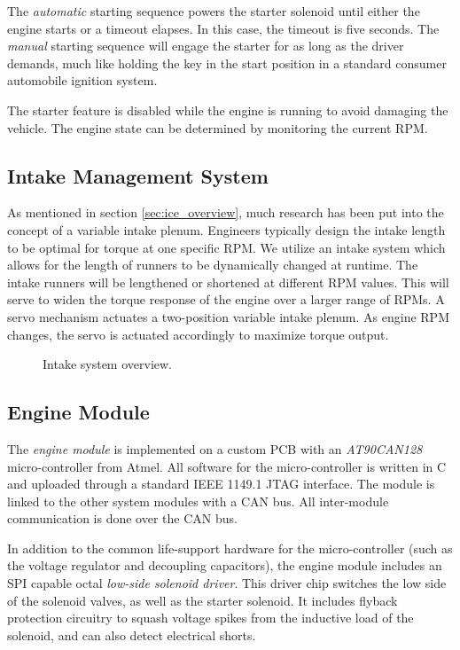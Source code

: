 The \emph{automatic} starting sequence powers the starter solenoid until either the engine starts or a timeout elapses. In this case, the timeout is five seconds. The \emph{manual} starting sequence will engage the starter for as long as the driver demands, much like holding the key in the start position in a standard consumer automobile ignition system. 

The starter feature is disabled while the engine is running to avoid damaging the vehicle. The engine state can be determined by monitoring the current RPM.

\subsection{Intake Management System}

As mentioned in section \ref{sec:ice_overview}, much research has been put into the concept of a variable intake plenum. Engineers typically design the intake length to be optimal for torque at one specific RPM. We utilize an intake system which allows for the length of runners to be dynamically changed at runtime. The intake runners will be lengthened or shortened at different RPM values. This will serve to widen the torque response of the engine over a larger range of RPMs. A servo mechanism actuates a two-position variable intake plenum. As engine RPM changes, the servo is actuated accordingly to maximize torque output.

\begin{figure}[H]
	\centering
		
	\caption{Intake system overview.}
	\label{fig:intake_system_overview}
\end{figure}

\subsection{Engine Module}
\label{sec:engine_module}

The \emph{engine module} is implemented on a custom PCB with an \emph{AT90CAN128} micro-controller from Atmel. All software for the micro-controller is written in C and uploaded through a standard IEEE 1149.1 JTAG interface. The module is linked to the other system modules with a CAN bus. All inter-module communication is done over the CAN bus.

In addition to the common life-support hardware for the micro-controller (such as the voltage regulator and decoupling capacitors), the engine module includes an SPI capable octal \emph{low-side solenoid driver}. This driver chip switches the low side of the solenoid valves, as well as the starter solenoid. It includes flyback protection circuitry to squash voltage spikes from the inductive load of the solenoid, and can also detect electrical shorts. 

